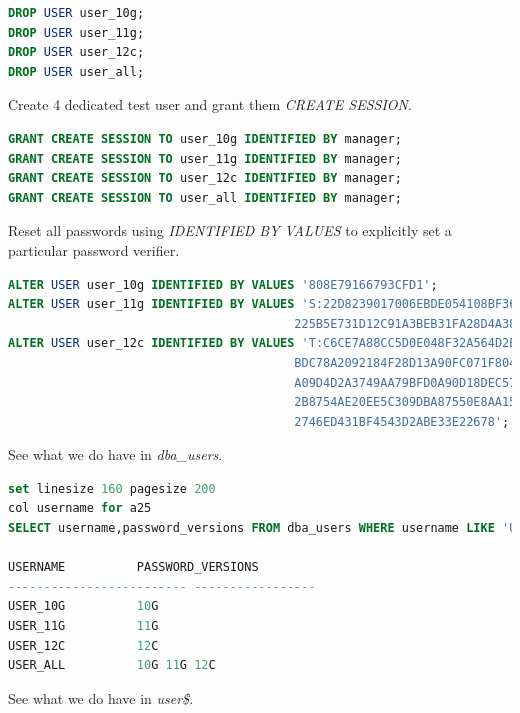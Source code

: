 \documentclass[a4paper,,tablecaptionabove]{scrartcl}
\begin{document}
\begin{lstlisting}[language=SQL]
DROP USER user_10g;
DROP USER user_11g;
DROP USER user_12c;
DROP USER user_all;
\end{lstlisting}

Create 4 dedicated test user and grant them \emph{CREATE SESSION}.

\begin{lstlisting}[language=SQL]
GRANT CREATE SESSION TO user_10g IDENTIFIED BY manager;
GRANT CREATE SESSION TO user_11g IDENTIFIED BY manager;
GRANT CREATE SESSION TO user_12c IDENTIFIED BY manager;
GRANT CREATE SESSION TO user_all IDENTIFIED BY manager;
\end{lstlisting}

Reset all passwords using \emph{IDENTIFIED BY VALUES} to explicitly set
a particular password verifier.

\begin{lstlisting}[language=SQL]
ALTER USER user_10g IDENTIFIED BY VALUES '808E79166793CFD1';
ALTER USER user_11g IDENTIFIED BY VALUES 'S:22D8239017006EBDE054108BF367F
                                        225B5E731D12C91A3BEB31FA28D4A38';
ALTER USER user_12c IDENTIFIED BY VALUES 'T:C6CE7A88CC5D0E048F32A564D2B6A7
                                        BDC78A2092184F28D13A90FC071F804E5E
                                        A09D4D2A3749AA79BFD0A90D18DEC5788D
                                        2B8754AE20EE5C309DBA87550E8AA15EAF
                                        2746ED431BF4543D2ABE33E22678';
\end{lstlisting}

See what we do have in \emph{dba\_users}.

\begin{lstlisting}[language=SQL]
set linesize 160 pagesize 200
col username for a25
SELECT username,password_versions FROM dba_users WHERE username LIKE 'USER_%' ORDER BY 1;

USERNAME          PASSWORD_VERSIONS
------------------------- -----------------
USER_10G          10G
USER_11G          11G
USER_12C          12C
USER_ALL          10G 11G 12C
\end{lstlisting}

See what we do have in \emph{user\$}.
\end{document}
